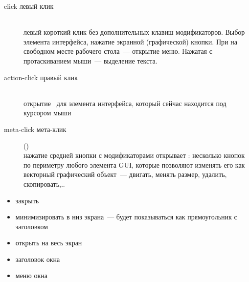 
\begin{description}
    \item[click левый клик \keys{\lms}]\ \\
    левый короткий клик без дополнительных клавиш-модификаторов. Выбор элемента интерфейса,
    нажатие экранной (графической) кнопки. При \keys{\lms} на свободном месте рабочего стола\ --- открытие  меню.
    Нажатая \keys{\lms} с протаскиванием мыши\ --- выделение текста.
    \item[action-click правый клик \keys{\rms}]\ \\
    открытие \ для элемента интерфейса, который сейчас находится под курсором мыши
    \clearpage{}
    \item[meta-click мета-клик ] (\linux)\ \\
    нажатие средней кнопки с модификаторами открывает : несколько кнопок по периметру любого элемента GUI,
    которые позволяют изменять его как векторный графический объект\ --- двигать, менять размер, удалить, скопировать,..
\end{description}



\begin{itemize}
    \item закрыть
    \item минимизировать в низ экрана\ --- будет показываться как прямоугольник с заголовком
    \item открыть на весь экран
    \item заголовок окна
    \item меню окна
\end{itemize}

\secup
